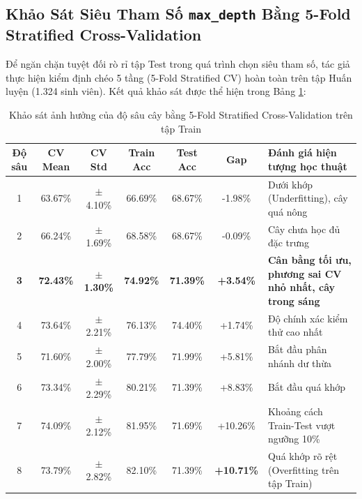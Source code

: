 \documentclass[12pt,a4paper]{article}
\begin{document}
\subsection{Khảo Sát Siêu Tham Số \texttt{max\_depth} Bằng 5-Fold Stratified Cross-Validation}
Để ngăn chặn tuyệt đối rò rỉ tập Test trong quá trình chọn siêu tham số, tác giả thực hiện kiểm định chéo 5 tầng (5-Fold Stratified CV) hoàn toàn trên tập Huấn luyện (1.324 sinh viên). Kết quả khảo sát được thể hiện trong Bảng \ref{tab:depth_tuning}:

\begin{table}[H]
\centering
\begin{tabularx}{\textwidth}{|c|c|c|c|c|c|X|}
\hline
\rowcolor{primaryblue}
\textbf{\color{white}Độ sâu} & \textbf{\color{white}CV Mean} & \textbf{\color{white}CV Std} & \textbf{\color{white}Train Acc} & \textbf{\color{white}Test Acc} & \textbf{\color{white}Gap} & \textbf{\color{white}Đánh giá hiện tượng học thuật} \\
\hline
1 & 63.67\% & $\pm$4.10\% & 66.69\% & 68.67\% & -1.98\% & Dưới khớp (Underfitting), cây quá nông \\
\hline
2 & 66.24\% & $\pm$1.69\% & 68.58\% & 68.67\% & -0.09\% & Cây chưa học đủ đặc trưng \\
\hline
\textbf{3} & \textbf{72.43\%} & \textbf{$\pm$1.30\%} & \textbf{74.92\%} & \textbf{71.39\%} & \textbf{+3.54\%} & \textbf{Cân bằng tối ưu, phương sai CV nhỏ nhất, cây trong sáng} \\
\hline
4 & 73.64\% & $\pm$2.21\% & 76.13\% & 74.40\% & +1.74\% & Độ chính xác kiểm thử cao nhất \\
\hline
5 & 71.60\% & $\pm$2.00\% & 77.79\% & 71.99\% & +5.81\% & Bắt đầu phân nhánh dư thừa \\
\hline
6 & 73.34\% & $\pm$2.29\% & 80.21\% & 71.39\% & +8.83\% & Bắt đầu quá khớp \\
\hline
7 & 74.09\% & $\pm$2.12\% & 81.95\% & 71.69\% & +10.26\% & Khoảng cách Train-Test vượt ngưỡng 10\% \\
\hline
8 & 73.79\% & $\pm$2.82\% & 82.10\% & 71.39\% & \textbf{+10.71\%} & Quá khớp rõ rệt (Overfitting trên tập Train) \\
\hline
\end{tabularx}
\caption{Khảo sát ảnh hưởng của độ sâu cây bằng 5-Fold Stratified Cross-Validation trên tập Train}
\label{tab:depth_tuning}
\end{table}
\end{document}

